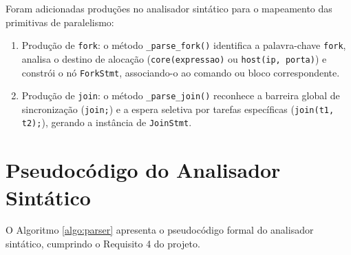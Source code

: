 Foram adicionadas produções no analisador sintático para o mapeamento das primitivas de paralelismo:
\begin{enumerate}
    \item Produção de \texttt{fork}: o método \texttt{\_parse\_fork()} identifica a palavra-chave \texttt{fork}, analisa o destino de alocação (\texttt{core(expressao)} ou \texttt{host(ip, porta)}) e constrói o nó \texttt{ForkStmt}, associando-o ao comando ou bloco correspondente.
    \item Produção de \texttt{join}: o método \texttt{\_parse\_join()} reconhece a barreira global de sincronização (\texttt{join;}) e a espera seletiva por tarefas específicas (\texttt{join(t1, t2);}), gerando a instância de \texttt{JoinStmt}.
\end{enumerate}

\section{Pseudocódigo do Analisador Sintático}

O Algoritmo \ref{algo:parser} apresenta o pseudocódigo formal do analisador sintático, cumprindo o Requisito 4 do projeto.

